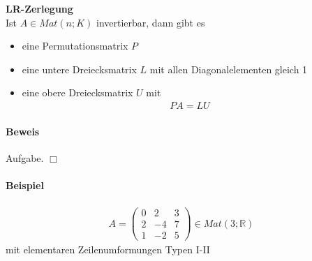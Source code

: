 \documentclass[11pt]{report}
\newcommand*\Zb[1] {\mathbb{#1}}
\newcommand*\f[1] {\textbf{#1}}
\begin{document}
\begin{satz} \f{LR-Zerlegung} \\
\label{satz631}
Ist $A \in Mat(n;K)$ invertierbar, dann gibt es 
\begin{itemize}
\item eine Permutationsmatrix $P$
\item eine untere Dreiecksmatrix $L$ mit allen Diagonalelementen gleich 1
\item eine obere Dreiecksmatrix $U$ mit
\begin{align}
PA = LU
\end{align}
\end{itemize}
\end{satz}

\paragraph{Beweis}
Aufgabe.\hspace*{1cm} \hfill $\Box$


\paragraph{Beispiel}
\begin{align}
A =\begin{pmatrix} 0 & 2 & 3 \\ 2 & -4 & 7 \\ 1 & -2 & 5 \end{pmatrix} \in Mat(3; \Zb{R})
\end{align}
mit elementaren Zeilenumformungen Typen I-II
\end{document}
